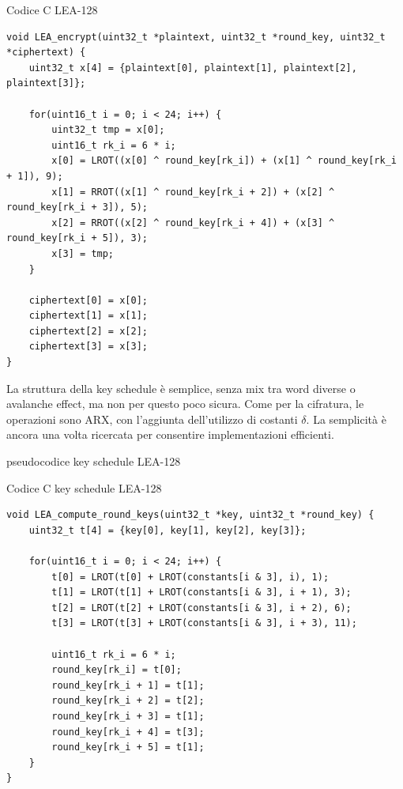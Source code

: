 \documentclass[target=bach,aauheader=,style=]{thud}
\begin{document}
			\begin{algorithm}
				\caption{Codice C LEA-128}
\begin{lstlisting}[style=CStyle]
void LEA_encrypt(uint32_t *plaintext, uint32_t *round_key, uint32_t *ciphertext) {
	uint32_t x[4] = {plaintext[0], plaintext[1], plaintext[2], plaintext[3]};
	
	for(uint16_t i = 0; i < 24; i++) {
		uint32_t tmp = x[0];
		uint16_t rk_i = 6 * i;
		x[0] = LROT((x[0] ^ round_key[rk_i]) + (x[1] ^ round_key[rk_i + 1]), 9);
		x[1] = RROT((x[1] ^ round_key[rk_i + 2]) + (x[2] ^ round_key[rk_i + 3]), 5);
		x[2] = RROT((x[2] ^ round_key[rk_i + 4]) + (x[3] ^ round_key[rk_i + 5]), 3);
		x[3] = tmp;
	}
	
	ciphertext[0] = x[0];
	ciphertext[1] = x[1];
	ciphertext[2] = x[2];
	ciphertext[3] = x[3];
}\end{lstlisting}
			\end{algorithm}
			La struttura della key schedule è semplice, senza mix tra word diverse o avalanche effect, ma non per questo poco sicura. Come per la cifratura, le operazioni sono ARX, con l'aggiunta dell'utilizzo di costanti $\delta$.
			La semplicità è ancora una volta ricercata per consentire implementazioni efficienti.
			\begin{algorithm}
				\caption{pseudocodice key schedule LEA-128}
				\begin{algorithmic}
						\EndFor
					\EndProcedure
				\end{algorithmic}
			\end{algorithm}
			\begin{algorithm}
				\caption{Codice C key schedule LEA-128}
\begin{lstlisting}[style=CStyle]
void LEA_compute_round_keys(uint32_t *key, uint32_t *round_key) {
	uint32_t t[4] = {key[0], key[1], key[2], key[3]};
	
	for(uint16_t i = 0; i < 24; i++) {
		t[0] = LROT(t[0] + LROT(constants[i & 3], i), 1);
		t[1] = LROT(t[1] + LROT(constants[i & 3], i + 1), 3);
		t[2] = LROT(t[2] + LROT(constants[i & 3], i + 2), 6);
		t[3] = LROT(t[3] + LROT(constants[i & 3], i + 3), 11);
		
		uint16_t rk_i = 6 * i;
		round_key[rk_i] = t[0];
		round_key[rk_i + 1] = t[1];
		round_key[rk_i + 2] = t[2];
		round_key[rk_i + 3] = t[1];
		round_key[rk_i + 4] = t[3];
		round_key[rk_i + 5] = t[1];
	}
}\end{lstlisting}
			\end{algorithm}
			
\end{document}
